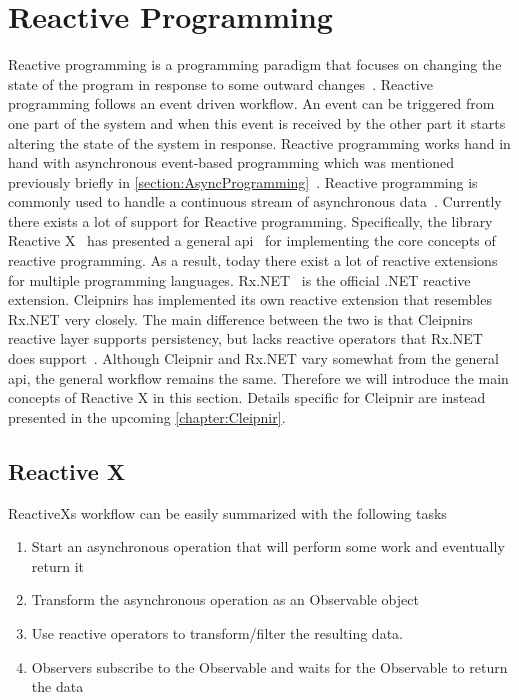\section{Reactive Programming}
\label{section:reactive}
\iffalse

Reactive programming is a programming paradigm that focuses on changing the state of the program in response to some outward changes~\cite{WEB:RxProgIntro, DOC:Cleipnir}.
Reactive programming follows an event driven workflow. An event can be triggered from one part of the system and when this event is received by the other part it starts altering the state of the system in response. Reactive programming works hand in hand with asynchronous event-based programming which was mentioned previously briefly in \autoref{section:AsyncProgramming}~\cite[p.~2-3]{BOOK:RxLinq}. Reactive programming is commonly used to handle a continuous stream of asynchronous data~\cite{VIDEO:dotnetsheffReactive}. 
Currently there exists a lot of support for Reactive programming. Specifically, the library Reactive X~\cite{WEB:ReactiveXMainPage} has presented a general \ac{api}~\cite{WEB:api} for implementing the core concepts of reactive programming. As a result, today there exist a lot of reactive extensions for multiple programming languages. Rx.NET~\cite{Github:ReactiveExtensions} is the official .NET reactive extension. Cleipnirs has implemented its own reactive extension that resembles Rx.NET very closely. The main difference between the two is that Cleipnirs reactive layer supports persistency, but lacks reactive operators that Rx.NET does support~\cite{DOC:Cleipnir}.
Although Cleipnir and Rx.NET vary somewhat from the general \ac{api}, the general workflow remains the same. Therefore we will introduce the main concepts of Reactive X in this section. Details specific for Cleipnir are instead presented in the upcoming \autoref{chapter:Cleipnir}.

\subsection{Reactive X}
ReactiveXs workflow can be easily summarized with the following tasks~\cite{WEB:ReactiveObservable}
\begin{enumerate}
	\item{Start an asynchronous operation that will perform some work and eventually return it}
	\item{Transform the asynchronous operation as an Observable object}
	\item{Use reactive operators to transform/filter the resulting data.}
	\item{Observers subscribe to the Observable and waits for the Observable to return the data}
\end{enumerate}

